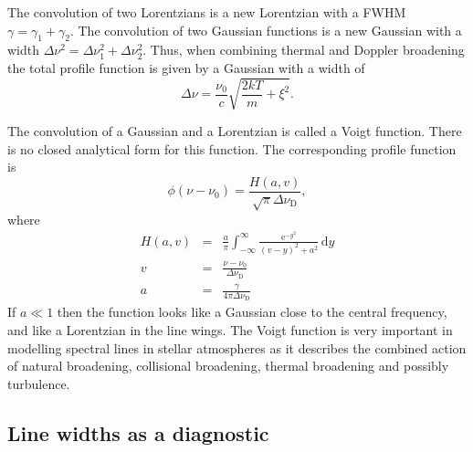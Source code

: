 \documentclass[12pt]{article}
\numberwithin{equation}{section}
\def\exp{\mathrm{e}}
\def\dd{\mathrm{d}}
\def\dnud{\ensuremath{\Delta \nu_\mathrm{D}}}
\newcommand{\be}{\begin{equation}}
\newcommand{\ee}{\end{equation}}
\newcommand{\bea}{\begin{eqnarray}}
\newcommand{\eea}{\end{eqnarray}}
\begin{document}
The convolution of two Lorentzians is a new Lorentzian with a FWHM $\gamma = \gamma_1 + \gamma_2$.
The convolution of two Gaussian functions is a new Gaussian with a width $\Delta \nu^2 = \Delta \nu_1^2 +  \Delta \nu_2^2$. Thus, when combining thermal and Doppler broadening the total profile function is given by a Gaussian with a width of
\be
\Delta \nu =  \frac{\nu_0}{c} \sqrt{\frac{2kT}{m} + \xi^2}.
\ee

The convolution of a Gaussian and a Lorentzian is called a Voigt function. There is no closed analytical form for this function. The corresponding profile function is
\be
\phi(\nu-\nu_0) = \frac{H(a,v)}{\sqrt{\pi} \dnud},
\ee
where
\bea
 H(a,v)&=&  \frac{a}{\pi} \int_{-\infty}^\infty \frac{\exp^{-y^2}}{(v-y)^2 + a^2 } \, \dd y\nonumber \\
 v&=& \frac{\nu-\nu_0}{\dnud}\nonumber \\
 a &=& \frac{\gamma}{4 \pi \dnud}
\eea
If $a \ll 1$ then the function looks like a Gaussian close to the central frequency, and like a Lorentzian in the line wings. The Voigt function is very important in modelling spectral lines in stellar atmospheres as it describes the combined action of natural broadening, collisional broadening, thermal broadening and possibly turbulence.

\subsection{Line widths as a diagnostic}
\end{document}
